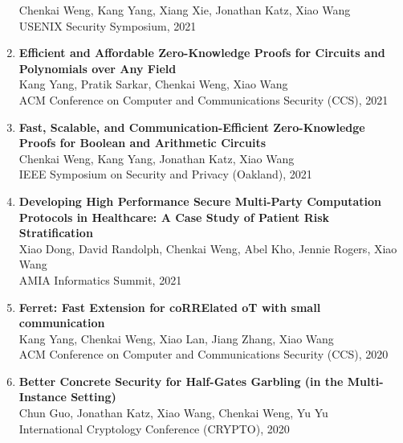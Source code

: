 \documentclass[letterpaper,11pt]{article}
\newcommand{\resumeItem}[1]{
  \item\small{
    {#1 \vspace{-2pt}}
  }
}
\newcommand{\resumeItemListStart}{\begin{itemize}}
\begin{document}
\begin{enumerate}[leftmargin=0.20in]
		{\small Chenkai Weng, Kang Yang, Xiang Xie, Jonathan Katz, Xiao Wang \vspace{-2pt}} \\
		{\small USENIX Security Symposium, 2021}
  \item
	  {\textbf{\small Efficient and Affordable Zero-Knowledge Proofs for Circuits and Polynomials over Any Field}} \\
		{\small Kang Yang, Pratik Sarkar, Chenkai Weng, Xiao Wang \vspace{-2pt}} \\
		{\small ACM Conference on Computer and Communications Security (CCS), 2021}
  \item
          {\textbf{\small Fast, Scalable, and Communication-Efficient Zero-Knowledge Proofs for Boolean and Arithmetic Circuits}} \\
		{\small Chenkai Weng, Kang Yang, Jonathan Katz, Xiao Wang \vspace{-2pt}} \\
		{\small IEEE Symposium on Security and Privacy (Oakland), 2021}
  \item
          {\textbf{\small Developing High Performance Secure Multi-Party Computation Protocols in Healthcare: A Case Study of Patient Risk Stratification}} \\
		{\small Xiao Dong, David Randolph, Chenkai Weng, Abel Kho, Jennie Rogers, Xiao Wang \vspace{-2pt}} \\
		{\small AMIA Informatics Summit, 2021}
  \item
          {\textbf{\small Ferret: Fast Extension for coRRElated oT with small communication}} \\
		{\small Kang Yang, Chenkai Weng, Xiao Lan, Jiang Zhang, Xiao Wang\vspace{-2pt}} \\
		{\small ACM Conference on Computer and Communications Security (CCS), 2020}
  \item
          {\textbf{\small Better Concrete Security for Half-Gates Garbling (in the Multi-Instance Setting)}} \\
		{\small Chun Guo, Jonathan Katz, Xiao Wang, Chenkai Weng, Yu Yu\vspace{-2pt}} \\ 
		{\small International Cryptology Conference (CRYPTO), 2020}
\end{enumerate}
\end{document}

